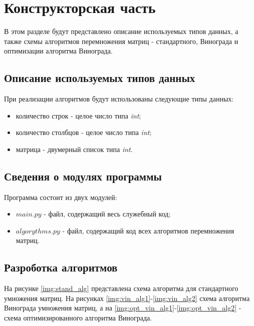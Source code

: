\chapter{Конструкторская часть}
В этом разделе будут представлено описание используемых типов данных, а также схемы алгоритмов перемножения матриц - стандартного, Винограда и оптимизации алгоритма Винограда.

\section{Описание используемых типов данных}

При реализации алгоритмов будут использованы следующие типы данных:

\begin{itemize}
	\item количество строк - целое число типа \textit{int};
	\item количество столбцов - целое число типа \textit{int};
	\item матрица - двумерный список типа \textit{int}.
\end{itemize}


\section{Сведения о модулях программы}
Программа состоит из двух модулей:
\begin{itemize}
	\item $main.py$ - файл, содержащий весь служебный код;
    \item $algorythms.py$ - файл, содержащий код всех алгоритмов перемножения матриц. \newline
\end{itemize}


\section{Разроботка алгоритмов}
На рисунке \ref{img:stand_alg} представлена схема алгоритма для стандартного умножения матриц. На рисунках \ref{img:vin_alg1}-\ref{img:vin_alg2} схема алгоритма Винограда умножения матриц, а на \ref{img:opt_vin_alg1}-\ref{img:opt_vin_alg2} - схема оптимизированного алгоритма Винограда. 


